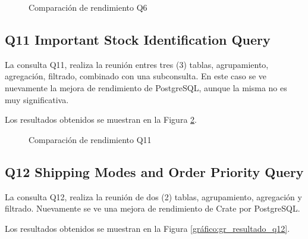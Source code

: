 \documentclass[11pt, twocolumns]{article}
\begin{document}
\begin{multicols}{2}
\begin{figure}[H]
    \caption{Comparación de rendimiento Q6}
	\label{gráfico:gr_resultado_q6}
\end{figure}


\subsection{Q11 Important Stock Identification Query}
La consulta Q11, realiza la reunión entres tres (3) tablas, agrupamiento, agregación, filtrado, combinado con una subconsulta. En este caso se ve nuevamente la mejora de rendimiento de PostgreSQL, aunque la misma no es muy significativa.
\par
Los resultados obtenidos se muestran en la Figura \ref{gráfico:gr_resultado_q11}.

\begin{figure}[H]
    \caption{Comparación de rendimiento Q11}
	\label{gráfico:gr_resultado_q11}
\end{figure}


\subsection{Q12 Shipping Modes and Order Priority Query}
La consulta Q12, realiza la reunión de dos (2) tablas, agrupamiento, agregación y filtrado. Nuevamente se ve una mejora de rendimiento de Crate por PostgreSQL.
\par
Los resultados obtenidos se muestran en la Figura \ref{gráfico:gr_resultado_q12}.


\end{multicols}
\end{document}

